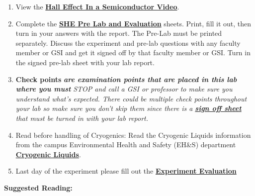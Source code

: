\documentclass{../lab}
\begin{document}
\begin{enumerate}
    \item View the \href{http://youtu.be/7JYq1rRl6Xk}{\textbf{Hall Effect In a Semiconductor Video}}.

    \item Complete the \href{http://experimentationlab.berkeley.edu/SHEPreLab}{\textbf{SHE Pre Lab and Evaluation}} sheets. Print, fill it out, then turn in your answers with the report. The Pre-Lab must be printed separately. Discuss the experiment and pre-lab questions with any faculty member or GSI and get it signed off by that faculty member or GSI. Turn in the signed pre-lab sheet with your lab report.

    \item \textbf{Check points} \emph{\textbf{are examination points that are placed in this lab where you must }}\emph{STOP and call a GSI or professor to make sure you understand what's expected. There could  be multiple check points throughout your lab so make sure you don't skip them since there is a \href{http://experimentationlab.berkeley.edu/shecheckpoints}{\textbf{sign off sheet}} that must be turned in with your lab report. }

    \item Read before handling of Cryogenics: Read the Cryogenic Liquids information from the campus Environmental Health and Safety (EH\&S) department \href{http://experimentationlab.berkeley.edu/sites/default/files/images/77cryogenic.pdf}{\textbf{Cryogenic Liquids}}.

    \item Last day of the experiment please fill out the \href{\ExperimentEvaluation}{\textbf{Experiment Evaluation}}

\end{enumerate}

\noindent\textbf{Suggested Reading:}
\end{document}
